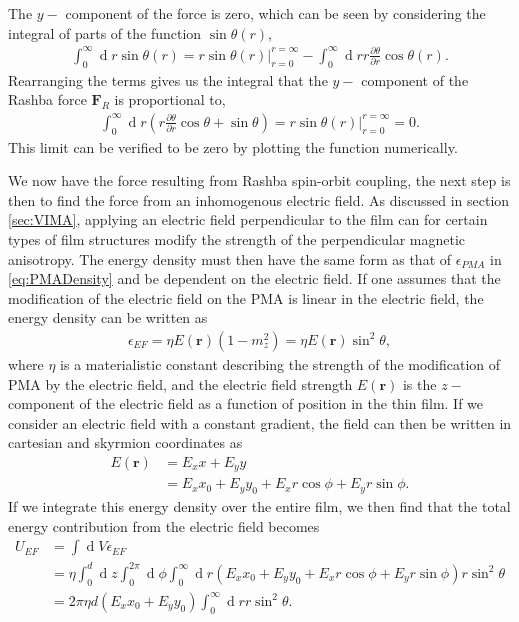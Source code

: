 \documentclass[12pt, a4paper, twoside, openright]{report}
\renewcommand{\d}[1]{\ensuremath{\operatorname{d}\!{#1}}}
\numberwithin{equation}{chapter}
\numberwithin{figure}{chapter}
\numberwithin{table}{chapter}
\begin{document}
The $y-$ component of the force is zero, which can be seen by considering the integral of parts of the function $\sin\theta(r)$,
\begin{align}
\int_0^{\infty} \d r \sin\theta(r) = r\sin\theta(r)|_{r = 0}^{r=\infty} - \int_0^{\infty} \d r r \frac{\partial \theta}{\partial r} \cos\theta(r).
\end{align}
Rearranging the terms gives us the integral that the $y-$ component of the Rashba force $\mathbold{F}_R$ is proportional to,
\begin{align}
\int_0^{\infty} \d r \left(r\frac{\partial \theta}{\partial r}\cos\theta + \sin\theta\right) = r\sin\theta(r)|_{r = 0}^{r=\infty} = 0.
\end{align}
This limit can be verified to be zero by plotting the function numerically.

We now have the force resulting from Rashba spin-orbit coupling, the next step is then to find the force from an inhomogenous electric field. As discussed in section \ref{sec:VIMA}, applying an electric field perpendicular to the film can for certain types of film structures modify the strength of the perpendicular magnetic anisotropy. The energy density must then have the same form as that of $\epsilon_{PMA}$ in \eqref{eq:PMADensity} and be dependent on the electric field. If one assumes that the modification of the electric field on the PMA is linear in the electric field, the energy density can be written as
\begin{align}
\epsilon_{EF} = \eta E(\mathbold{r}) \left(1-m_z^2\right) = \eta E(\mathbold{r}) \sin^2\theta,
\end{align}
where $\eta$ is a materialistic constant describing the strength of the modification of PMA by the electric field, and the electric field strength $E(\mathbold{r})$ is the $z-$ component of the electric field as a function of position in the thin film. If we consider an electric field with a constant gradient, the field can then be written in cartesian and skyrmion coordinates as
\begin{subequations}
\begin{align}
E(\mathbold{r}) &= E_x x + E_y y \\
&= E_x x_0 + E_y y_0 + E_x r \cos\phi + E_y r \sin\phi.
\end{align}
\end{subequations}
If we integrate this energy density over the entire film, we then find that the total energy contribution from the electric field becomes
\begin{align}
\nonumber U_{EF} &= \int \d V \epsilon_{EF} \\
\nonumber &= \eta \int_0^d \d z \int_0^{2\pi}\d \phi \int_0^{\infty}\d r\left( E_x x_0 + E_y y_0 + E_x r \cos\phi + E_y r \sin\phi \right) r \sin^2\theta \\
&= 2\pi\eta d\left(E_x x_0 + E_y y_0\right)\int_0^{\infty}\d r r \sin^2\theta.
\end{align}
\end{document}
